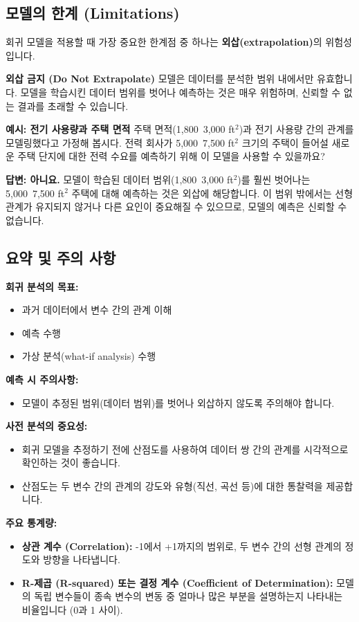 \documentclass[11pt,a4paper]{article}
\begin{document}
\subsection{모델의 한계 (Limitations)}
회귀 모델을 적용할 때 가장 중요한 한계점 중 하나는 \textbf{외삽(extrapolation)}의 위험성입니다.

\begin{cautionbox}
\textbf{외삽 금지 (Do Not Extrapolate)}
모델은 데이터를 분석한 범위 내에서만 유효합니다. 모델을 학습시킨 데이터 범위를 벗어나 예측하는 것은 매우 위험하며, 신뢰할 수 없는 결과를 초래할 수 있습니다.
\end{cautionbox}

\begin{examplebox}
\textbf{예시: 전기 사용량과 주택 면적}
주택 면적(1,800~3,000 ft$^2$)과 전기 사용량 간의 관계를 모델링했다고 가정해 봅시다. 전력 회사가 5,000~7,500 ft$^2$ 크기의 주택이 들어설 새로운 주택 단지에 대한 전력 수요를 예측하기 위해 이 모델을 사용할 수 있을까요?

\textbf{답변: 아니요.}
모델이 학습된 데이터 범위(1,800~3,000 ft$^2$)를 훨씬 벗어나는 5,000~7,500 ft$^2$ 주택에 대해 예측하는 것은 외삽에 해당합니다. 이 범위 밖에서는 선형 관계가 유지되지 않거나 다른 요인이 중요해질 수 있으므로, 모델의 예측은 신뢰할 수 없습니다.
\end{examplebox}

\subsection{요약 및 주의 사항}
\begin{summarybox}
\textbf{회귀 분석의 목표:}
\begin{itemize}
    \item 과거 데이터에서 변수 간의 관계 이해
    \item 예측 수행
    \item 가상 분석(what-if analysis) 수행
\end{itemize}
\textbf{예측 시 주의사항:}
\begin{itemize}
    \item 모델이 추정된 범위(데이터 범위)를 벗어나 외삽하지 않도록 주의해야 합니다.
\end{itemize}
\textbf{사전 분석의 중요성:}
\begin{itemize}
    \item 회귀 모델을 추정하기 전에 산점도를 사용하여 데이터 쌍 간의 관계를 시각적으로 확인하는 것이 좋습니다.
    \item 산점도는 두 변수 간의 관계의 강도와 유형(직선, 곡선 등)에 대한 통찰력을 제공합니다.
\end{itemize}
\textbf{주요 통계량:}
\begin{itemize}
    \item \textbf{상관 계수 (Correlation):} -1에서 +1까지의 범위로, 두 변수 간의 선형 관계의 정도와 방향을 나타냅니다.
    \item \textbf{R-제곱 (R-squared) 또는 결정 계수 (Coefficient of Determination):} 모델의 독립 변수들이 종속 변수의 변동 중 얼마나 많은 부분을 설명하는지 나타내는 비율입니다 (0과 1 사이).
\end{itemize}
\end{summarybox}
\end{document}

